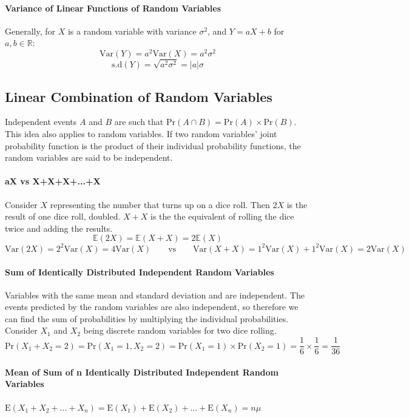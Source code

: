 \documentclass[a4paper,twoside]{article}
\newcommand{\E}{\mathbb{E}}
\begin{document}
			\paragraph{Variance of Linear Functions of Random Variables} Generally, for $X$ is a random variable with variance $\sigma^2$, and $Y=aX+b$ for $a,b\in\mathbb{R}$:
			\[
				\mathrm{Var}(Y)=a^2\mathrm{Var}(X)=a^2\sigma^2
			\]
			\[
				\mathrm{s.d}(Y)=\sqrt{a^2\sigma^2}=|a|\sigma
			\]
		\subsection{Linear Combination of Random Variables}
			Independent events $A$ and $B$ are such that $\mathrm{Pr}(A\cap B)=\mathrm{Pr}(A)\times\mathrm{Pr}(B)$. This idea also applies to random variables. If two random variables' joint probability function is the product of their individual probability functions, the random variables are said to be independent.
			
			\paragraph{aX vs X+X+X+...+X} Consider $X$ representing the number that turns up on a dice roll. Then $2X$ is the result of one dice roll, doubled. $X+X$ is the the equivalent of rolling the dice twice and adding the results.
			\[
				\E(2X)=\E(X+X)=2\E(X)
			\]
			\[
				\mathrm{Var}(2X)=2^2\mathrm{Var}(X)=4\mathrm{Var}(X) \qquad \text{vs} \qquad \mathrm{Var}(X+X)=1^2\mathrm{Var}(X)+1^2\mathrm{Var}(X)=2\mathrm{Var}(X)
			\]
			
			\paragraph{Sum of Identically Distributed Independent Random Variables} Variables with the same mean and standard deviation and are independent. The events predicted by the random variables are also independent, so therefore we can find the sum of probabilities by multiplying the individual probabilities. Consider $X_1$ and $X_2$ being discrete random variables for two dice rolling.
			\[
				\mathrm{Pr}(X_1+X_2=2)=\mathrm{Pr}(X_1=1,X_2=2)=\mathrm{Pr}(X_1=1)\times\mathrm{Pr}(X_2=1)=\frac{1}{6}\times\frac{1}{6}=\frac{1}{36}
			\]
			
			\paragraph{Mean of Sum of n Identically Distributed Independent Random Variables} $\displaystyle\mathrm{E}(X_1+X_2+...+X_n)=\mathrm{E}(X_1)+\mathrm{E}(X_2)+...+\mathrm{E}(X_n)=n\mu$
			
\end{document}
